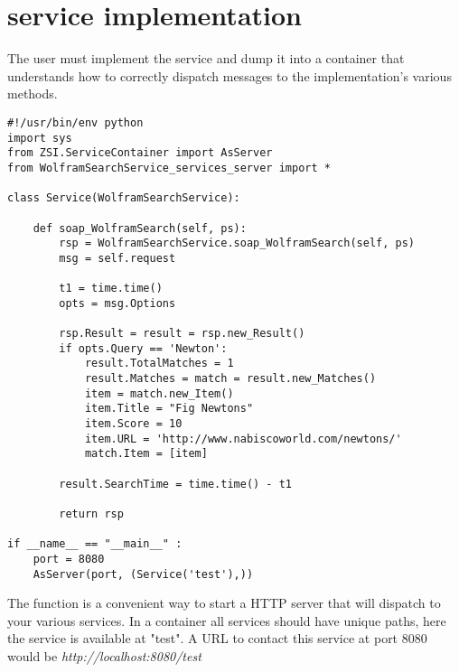 \section{service implementation}
The user must implement the service and dump it into a container that understands
how to correctly dispatch messages to the implementation's various methods.  


\begin{verbatim}
#!/usr/bin/env python 
import sys
from ZSI.ServiceContainer import AsServer
from WolframSearchService_services_server import *

class Service(WolframSearchService):

    def soap_WolframSearch(self, ps):
        rsp = WolframSearchService.soap_WolframSearch(self, ps)
        msg = self.request

        t1 = time.time()
        opts = msg.Options

        rsp.Result = result = rsp.new_Result()
        if opts.Query == 'Newton':
            result.TotalMatches = 1
            result.Matches = match = result.new_Matches()
            item = match.new_Item()
            item.Title = "Fig Newtons"
            item.Score = 10
            item.URL = 'http://www.nabiscoworld.com/newtons/'
            match.Item = [item]

        result.SearchTime = time.time() - t1

        return rsp

if __name__ == "__main__" :
    port = 8080
    AsServer(port, (Service('test'),))

\end{verbatim}

The  function is a convenient way to 
start a HTTP server that will dispatch to your various services.  In a
container all services should have unique paths, here the service is
available at "test".  A URL to contact this service at port 8080 would be
\emph{http://localhost:8080/test}

